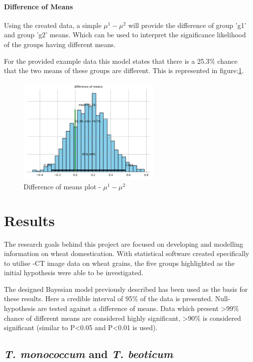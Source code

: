 \documentclass[11pt]{report}
\begin{document}
\subsubsection{Difference of Means}
\label{sec:org5b5dcda}
Using the created data, a simple \(\mu^1 - \mu^2\) will provide the difference of group 'g1' and group 'g2' means. Which can be used to interpret the significance likelihood of the groups having different means.

For the provided example data this model states that there is a 25.3\% chance that the two means of these groups are different. This is represented in figure:\ref{fig:org53de72e}.
\begin{figure}[htbp]
\centering
\includegraphics[width=7cm]{./images/examplebayes2.png}
\caption{\label{fig:org53de72e}
Difference of means plot - \(\mu^1 - \mu^2\)}
\end{figure}



\chapter{Results}
\label{sec:org0e52048}
The research goals behind this project are focused on developing and modelling information on wheat domestication. With statistical software created specifically to utilise \textmu{}-CT image data on wheat grains, the five groups highlighted as the initial hypothesis were able to be investigated.

The designed Bayesian model previously described has been used as the basis for these results. Here a credible interval of 95\% of the data is presented. Null-hypothesis are tested against a difference of means. Data which present >99\% chance of different means are considered highly significant, >90\% is considered significant (similar to P<0.05 and P<0.01 is used).

\clearpage

\section{\emph{T. monococcum} and \emph{T. beoticum}}
\label{sec:org0fd3289}
\end{document}
